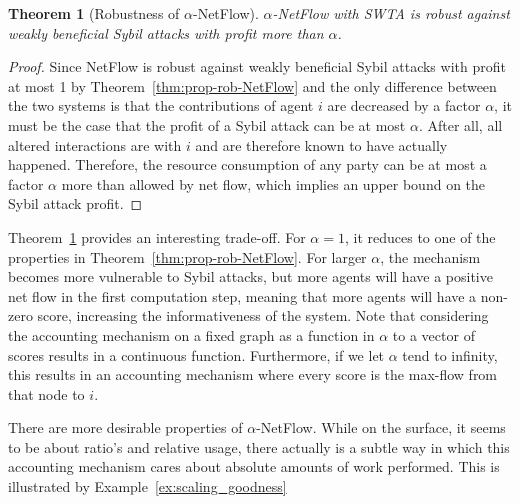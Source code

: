\documentclass[a4paper,11pt]{book}
\newtheorem{theorem}{Theorem}
\theoremstyle{definition}
\begin{document}
\begin{theorem}[Robustness of $\alpha$-NetFlow]
    $\alpha$-NetFlow with SWTA is robust against weakly beneficial Sybil attacks with
    profit more than $\alpha$.
    \label{thm:Sybil-anf}
\end{theorem}

\begin{proof}
    Since NetFlow is robust against weakly beneficial Sybil attacks with profit at most
    1 by Theorem~\ref{thm:prop-rob-NetFlow}  and the only difference between the two systems is that the contributions of
    agent $i$ are decreased by a factor $\alpha$, it must be the case that the profit
    of a Sybil attack can be at most $\alpha$. After all, all altered interactions
    are with $i$ and are therefore known to have actually happened. Therefore, the
    resource consumption of any party can be at most a factor $\alpha$ more than allowed
    by net flow, which implies an upper bound on the Sybil attack profit.
\end{proof}

Theorem~\ref{thm:Sybil-anf} provides an interesting trade-off. For $\alpha=1$, it reduces
to one of the properties in Theorem~\ref{thm:prop-rob-NetFlow}. For larger $\alpha$,
the mechanism becomes more vulnerable to Sybil attacks, but more agents will have
a positive net flow in the first computation step, meaning that more agents will
have a non-zero score, increasing the informativeness of the system. Note
that considering the accounting mechanism on a fixed graph as a function in $\alpha$ to
a vector of scores results in a continuous function. Furthermore, if we let $\alpha$
tend to infinity, this results in an accounting mechanism where every score is the
max-flow from that node to $i$. 


There are more desirable properties of $\alpha$-NetFlow. While on the surface, it seems to
be about ratio's and relative usage, there actually is a subtle way in which
this accounting mechanism cares about absolute amounts of work performed. This
is illustrated by Example~\ref{ex:scaling_goodness}
\end{document}
